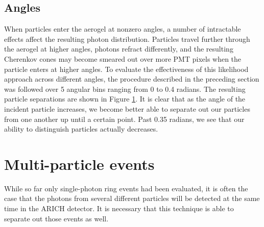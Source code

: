 \subsection{Angles}
When particles enter the aerogel at nonzero angles, a number of intractable effects affect the resulting photon distribution. 
Particles travel further through the aerogel at higher angles, photons refract differently, and the resulting Cherenkov cones may become smeared out over more PMT pixels when the particle enters at higher angles. 
To evaluate the effectiveness of this likelihood approach across different angles, the procedure described in the preceding section was followed over 5 angular bins ranging from 0 to 0.4 radians.
The resulting particle separations are shown in Figure \ref{fig:angleSeps}.
It is clear that as the angle of the incident particle increases, we become better able to separate out our particles from one another up until a certain point.
Past 0.35 radians, we see that our ability to distinguish particles actually decreases.
 

\begin{figure}[]
\centering
{}
\caption[\TODO{}]{}
\label{fig:angleSeps}
\end{figure}

\section{Multi-particle events}
While so far only single-photon ring events had been evaluated, it is often the case that the photons from several different particles will be detected at the same time in the ARICH detector.
It is necessary that this technique is able to separate out those events as well. 


